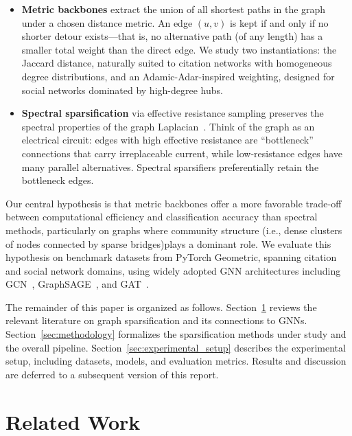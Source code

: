 \documentclass[conference]{IEEEtran}
\begin{document}
\begin{itemize}
    \item \textbf{Metric backbones} extract the union of all shortest paths in the graph under a chosen distance metric. An edge $(u,v)$ is kept if and only if no shorter detour exists---that is, no alternative path (of any length) has a smaller total weight than the direct edge. We study two instantiations: the Jaccard distance, naturally suited to citation networks with homogeneous degree distributions, and an Adamic-Adar-inspired weighting, designed for social networks dominated by high-degree hubs.
    \item \textbf{Spectral sparsification} via effective resistance sampling preserves the spectral properties of the graph Laplacian~\cite{spielman2008}. Think of the graph as an electrical circuit: edges with high effective resistance are ``bottleneck'' connections that carry irreplaceable current, while low-resistance edges have many parallel alternatives. Spectral sparsifiers preferentially retain the bottleneck edges.
\end{itemize}

Our central hypothesis is that metric backbones offer a more favorable trade-off between computational efficiency and classification accuracy than spectral methods, particularly on graphs where community structure (i.e., dense clusters of nodes connected by sparse bridges)plays a dominant role. We evaluate this hypothesis on benchmark datasets from PyTorch Geometric, spanning citation and social network domains, using widely adopted GNN architectures including GCN~\cite{kipf2017}, GraphSAGE~\cite{hamilton2017}, and GAT~\cite{velickovic2018}.

The remainder of this paper is organized as follows. Section~\ref{sec:related} reviews the relevant literature on graph sparsification and its connections to GNNs. Section~\ref{sec:methodology} formalizes the sparsification methods under study and the overall pipeline. Section~\ref{sec:experimental_setup} describes the experimental setup, including datasets, models, and evaluation metrics. Results and discussion are deferred to a subsequent version of this report.

\section{Related Work}\label{sec:related}
\end{document}
